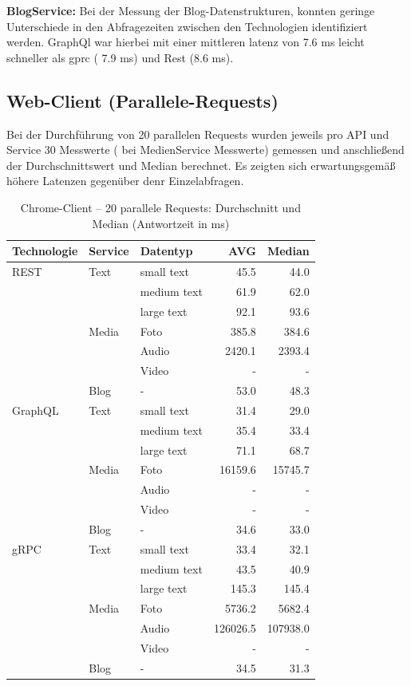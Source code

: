 \textbf{BlogService:}  
Bei der Messung der Blog-Datenstrukturen, konnten geringe Unterschiede in den Abfragezeiten zwischen den Technologien identifiziert werden. GraphQl war hierbei mit einer mittleren latenz von 7.6 ms leicht schneller als gprc ( 7.9 ms) und Rest (8.6 ms).

\subsection{{Web-Client (Parallele-Requests)}}
Bei der Durchführung von 20 parallelen Requests wurden jeweils pro API und Service 30 Messwerte ( bei MedienService Messwerte) gemessen und anschließend der Durchschnittswert und Median berechnet. Es zeigten sich erwartungsgemäß höhere Latenzen gegenüber denr Einzelabfragen. 

\begin{table}[h]
	\centering
	\caption{Chrome-Client – 20 parallele Requests: Durchschnitt und Median (Antwortzeit in ms)}
	\label{tab:chrome-20req}
	\renewcommand{\arraystretch}{1.1}
	\begin{tabular}{|l|l|l|r|r|}
		\hline
		\textbf{Technologie} & \textbf{Service} & \textbf{Datentyp} & \textbf{AVG} & \textbf{Median} \\
		\hline
		REST & Text  & small text  & 45.5 & 44.0 \\
		&       & medium text & 61.9 & 62.0 \\
		&       & large text  & 92.1 & 93.6 \\
		& Media & Foto        & 385.8 & 384.6 \\
		&       & Audio       & 2420.1 & 2393.4 \\
		&       & Video       & - & - \\
		& Blog  & -           & 53.0 & 48.3 \\
		\hline
		GraphQL & Text  & small text  & 31.4 & 29.0 \\
		&       & medium text & 35.4 & 33.4 \\
		&       & large text  & 71.1 & 68.7 \\
		& Media & Foto        & 16159.6 & 15745.7 \\
		&       & Audio       & - & - \\
		&       & Video       & - & - \\
		& Blog  & -           & 34.6 & 33.0 \\
		\hline
		gRPC & Text  & small text  & 33.4 & 32.1 \\
		&       & medium text & 43.5 & 40.9 \\
		&       & large text  & 145.3 & 145.4 \\
		& Media & Foto        & 5736.2 & 5682.4 \\
		&       & Audio       & 126026.5 & 107938.0 \\
		&       & Video       & - & - \\
		& Blog  & -           & 34.5 & 31.3 \\
		\hline
	\end{tabular}
\end{table}
\clearpage

